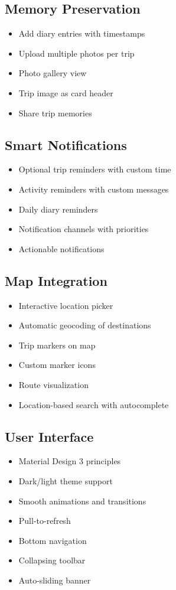 \documentclass[12pt,a4paper]{article}
\begin{document}
\subsection{Memory Preservation}
\begin{itemize}
    \item Add diary entries with timestamps
    \item Upload multiple photos per trip
    \item Photo gallery view
    \item Trip image as card header
    \item Share trip memories
\end{itemize}

\subsection{Smart Notifications}
\begin{itemize}
    \item Optional trip reminders with custom time
    \item Activity reminders with custom messages
    \item Daily diary reminders
    \item Notification channels with priorities
    \item Actionable notifications
\end{itemize}

\subsection{Map Integration}
\begin{itemize}
    \item Interactive location picker
    \item Automatic geocoding of destinations
    \item Trip markers on map
    \item Custom marker icons
    \item Route visualization
    \item Location-based search with autocomplete
\end{itemize}

\subsection{User Interface}
\begin{itemize}
    \item Material Design 3 principles
    \item Dark/light theme support
    \item Smooth animations and transitions
    \item Pull-to-refresh
    \item Bottom navigation
    \item Collapsing toolbar
    \item Auto-sliding banner
\end{itemize}
\end{document}
